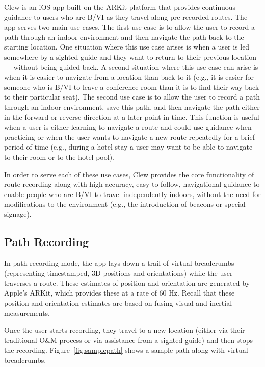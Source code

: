 \documentclass[chi_draft]{sigchi}
\newcommand{\BVI}{B/VI\xspace}
\newcommand{\OM}{O\&M\xspace}
\begin{document}
Clew is an iOS app built on the ARKit platform that provides continuous guidance to users who are \BVI as they travel along pre-recorded routes.  The app serves two main use cases.  The first use case is to allow the user to record a path through an indoor environment and then navigate the path back to the starting location.  One situation where this use case arises is when a user is led somewhere by a sighted guide and they want to return to their previous location --- without being guided back.  A second situation where this use case can arise is when it is easier to navigate from a location than back to it (e.g., it is easier for someone who is \BVI to leave a conference room than it is to find their way back to their particular seat).  The second use case is to allow the user to record a path through an indoor environment, save this path, and then navigate the path either in the forward or reverse direction at a later point in time.  This function is useful when a user is either learning to navigate a route and could use guidance when practicing or when the user wants to navigate a new route repeatedly for a brief period of time (e.g., during a hotel stay a user may want to be able to navigate to their room or to the hotel pool).

In order to serve each of these use cases, Clew provides the core functionality of route recording along with high-accuracy, easy-to-follow, navigational guidance to enable people who are \BVI to travel independently indoors, without the need for modifications to the environment (e.g., the introduction of beacons or special signage).

\subsection{Path Recording}

In path recording mode, the app lays down a trail of virtual breadcrumbs (representing timestamped, 3D positions and orientations) while the user traverses a route.  These estimates of position and orientation are generated by Apple's ARKit, which provides these at a rate of 60 Hz.  Recall that these position and orientation estimates are based on fusing visual and inertial measurements. %

Once the user starts recording, they travel to a new location (either via their traditional \OM process or via assistance from a sighted guide) and then stops the recording.  Figure~\ref{fig:samplepath} shows a sample path along with virtual breadcrumbs.
%
\end{document}

